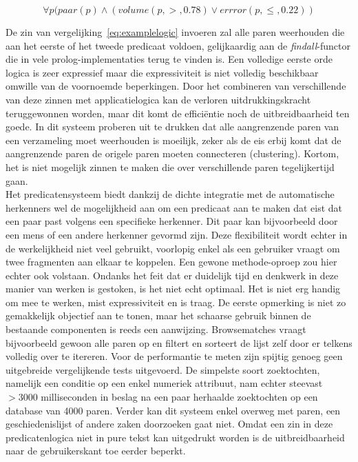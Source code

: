 \begin{equation}
\label{eq:examplelogic}
	\forall p (paar(p) \land (volume(p,>,0.78) \lor errror(p,\leq,0.22))
\end{equation}

De zin van vergelijking~\ref{eq:examplelogic} invoeren zal alle paren weerhouden die aan het eerste of het tweede predicaat voldoen, gelijkaardig aan de \emph{findall}-functor die in vele prolog-implementaties terug te vinden is. Een volledige eerste orde logica is zeer expressief maar die expressiviteit is niet volledig beschikbaar omwille van de voornoemde beperkingen. Door het combineren van verschillende van deze zinnen met applicatielogica kan de verloren uitdrukkingskracht teruggewonnen worden, maar dit komt de effici\"entie noch de uitbreidbaarheid ten goede. In dit systeem proberen uit te drukken dat alle aangrenzende paren van een verzameling moet weerhouden is moeilijk, zeker als de eis erbij komt dat de aangrenzende paren de origele paren moeten connecteren (clustering). Kortom, het is niet mogelijk zinnen te maken die over verschillende paren tegelijkertijd gaan.\\

Het predicatensysteem biedt dankzij de dichte integratie met de automatische herkenners wel de mogelijkheid aan om een predicaat aan te maken dat eist dat een paar past volgens een specifieke herkenner. Dit paar kan bijvoorbeeld door een mens of een andere herkenner gevormd zijn. Deze flexibiliteit wordt echter in de werkelijkheid niet veel gebruikt, voorlopig enkel als een gebruiker vraagt om twee fragmenten aan elkaar te koppelen. Een gewone methode-oproep zou hier echter ook volstaan. Ondanks het feit dat er duidelijk tijd en denkwerk in deze manier van werken is gestoken, is het niet echt optimaal. Het is niet erg handig om mee te werken, mist expressiviteit en is traag. De eerste opmerking is niet zo gemakkelijk objectief aan te tonen, maar het schaarse gebruik binnen de bestaande componenten is reeds een aanwijzing. Browsematches vraagt bijvoorbeeld gewoon alle paren op en filtert en sorteert de lijst zelf door er telkens volledig over te itereren. Voor de performantie te meten zijn spijtig genoeg geen uitgebreide vergelijkende tests uitgevoerd. De simpelste soort zoektochten, namelijk een conditie op een enkel numeriek attribuut, nam echter steevast $>3000$ milliseconden in beslag na een paar herhaalde zoektochten op een database van 4000 paren. Verder kan dit systeem enkel overweg met paren, een geschiedenislijst of andere zaken doorzoeken gaat niet. Omdat een zin in deze predicatenlogica niet in pure tekst kan uitgedrukt worden is de uitbreidbaarheid naar de gebruikerskant toe eerder beperkt.\\

